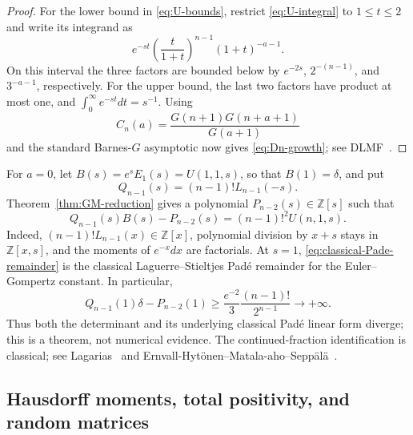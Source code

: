 \documentclass[11pt]{article}
\theoremstyle{definition}
\theoremstyle{remark}
\begin{document}
\begin{proof}
For the lower bound in \eqref{eq:U-bounds}, restrict
\eqref{eq:U-integral} to \(1\leq t\leq2\) and write its integrand as
\[
 e^{-st}\left(\frac{t}{1+t}\right)^{n-1}(1+t)^{-a-1}.
\]
On this interval the three factors are bounded below by
\(e^{-2s}\), \(2^{-(n-1)}\), and \(3^{-a-1}\), respectively.  For the upper
bound, the last two factors have product at most one, and
\(\int_0^\infty e^{-st}dt=s^{-1}\).
Using
\[
 C_n(a)=\frac{G(n+1)G(n+a+1)}{G(a+1)}
\]
and the standard Barnes-\(G\) asymptotic now gives
\eqref{eq:Dn-growth}; see DLMF~\cite[\S5.17]{DLMF}.
\end{proof}

For \(a=0\), let \(B(s)=e^sE_1(s)=U(1,1,s)\), so that
\(B(1)=\delta\), and put
\[
 Q_{n-1}(s)=(n-1)!L_{n-1}(-s).
\]
Theorem~\ref{thm:GM-reduction} gives a polynomial
\(P_{n-2}(s)\in\mathbb Z[s]\) such that
\begin{equation}
 \boxed{
 Q_{n-1}(s)B(s)-P_{n-2}(s)=(n-1)!^2U(n,1,s).}
 \label{eq:classical-Pade-remainder}
\end{equation}
Indeed, \((n-1)!L_{n-1}(x)\in\mathbb Z[x]\), polynomial division by
\(x+s\) stays in \(\mathbb Z[x,s]\), and the moments of \(e^{-x}dx\) are
factorials.  At \(s=1\), \eqref{eq:classical-Pade-remainder} is the classical
Laguerre--Stieltjes Pad\'e remainder for the Euler--Gompertz constant.  In
particular,
\begin{equation}
 Q_{n-1}(1)\delta-P_{n-2}(1)
 \geq \frac{e^{-2}}{3}\frac{(n-1)!}{2^{n-1}}
 \longrightarrow+\infty.
 \label{eq:Pade-divergence}
\end{equation}
Thus both the determinant and its underlying classical Pad\'e linear form
diverge; this is a theorem, not numerical evidence.  The continued-fraction
identification is classical; see
Lagarias~\cite[\S2.5]{Lagarias2013} and
Ernvall-Hyt\"onen--Matala-aho--Sepp\"al\"a~\cite{EMHS2023}.

\subsection{Hausdorff moments, total positivity, and random matrices}
\end{document}

